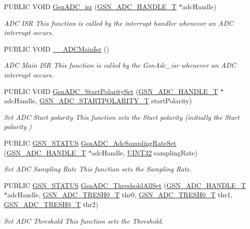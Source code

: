\begin{DoxyCompactItemize}
PUBLIC VOID \hyperlink{a00643_ga3b40bffec1620eff298e1fec173295fc}{GsnADC\_\-isr} (\hyperlink{a00024}{GSN\_\-ADC\_\-HANDLE\_\-T} $\ast$adcHandle)
\begin{DoxyCompactList}\small\item\em ADC ISR This function is called by the interrupt handler whenever an ADC interrupt occurs. \end{DoxyCompactList}\item 
PUBLIC VOID \hyperlink{a00643_ga2d67f9e3d0bb9310a26cd3508f485816}{\_\-\_\-ADCMainIsr} ()
\begin{DoxyCompactList}\small\item\em ADC Main ISR This function is called by the GsnAdc\_\-isr whenever an ADC interrupt occurs. \end{DoxyCompactList}\item 
PUBLIC VOID \hyperlink{a00643_gaea1be2fe47893500462843eec695e904}{GsnADC\_\-StartPolaritySet} (\hyperlink{a00024}{GSN\_\-ADC\_\-HANDLE\_\-T} $\ast$adcHandle, \hyperlink{a00643_gaaafebe738a6902a342c1226ce5ea8598}{GSN\_\-ADC\_\-STARTPOLARITY\_\-T} startPolarity)
\begin{DoxyCompactList}\small\item\em Set ADC Start polarity This function sets the Start polarity (initially the Start polarity ) \end{DoxyCompactList}\item 
PUBLIC \hyperlink{a00660_gada5951904ac6110b1fa95e51a9ddc217}{GSN\_\-STATUS} \hyperlink{a00643_ga8a1e2ad9db2c132be29bd129fa22436b}{GsnADC\_\-AdcSamplingRateSet} (\hyperlink{a00024}{GSN\_\-ADC\_\-HANDLE\_\-T} $\ast$adcHandle, \hyperlink{a00660_gae1e6edbbc26d6fbc71a90190d0266018}{UINT32} samplingRate)
\begin{DoxyCompactList}\small\item\em Set ADC Sampling Rate This function sets the Sampling Rate. \end{DoxyCompactList}\item 
PUBLIC \hyperlink{a00660_gada5951904ac6110b1fa95e51a9ddc217}{GSN\_\-STATUS} \hyperlink{a00643_gac19751aaeabd7689d2f173a7f848511d}{GsnADC\_\-ThresholdAllSet} (\hyperlink{a00024}{GSN\_\-ADC\_\-HANDLE\_\-T} $\ast$adcHandle, \hyperlink{a00026}{GSN\_\-ADC\_\-TRESH0\_\-T} thr0, \hyperlink{a00026}{GSN\_\-ADC\_\-TRESH0\_\-T} thr1, \hyperlink{a00026}{GSN\_\-ADC\_\-TRESH0\_\-T} thr2)
\begin{DoxyCompactList}\small\item\em Set ADC Threshold This function sets the Threshold. \end{DoxyCompactList}\item 

\end{DoxyCompactItemize}
